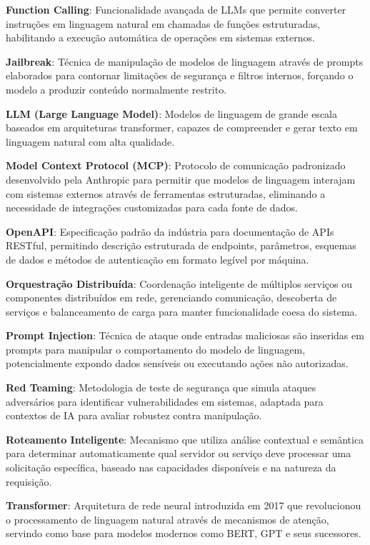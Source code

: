 \documentclass[
]{article}
\begin{document}
\textbf{Function Calling}: Funcionalidade avançada de LLMs que permite
converter instruções em linguagem natural em chamadas de funções
estruturadas, habilitando a execução automática de operações em sistemas
externos.

\textbf{Jailbreak}: Técnica de manipulação de modelos de linguagem
através de prompts elaborados para contornar limitações de segurança e
filtros internos, forçando o modelo a produzir conteúdo normalmente
restrito.

\textbf{LLM (Large Language Model)}: Modelos de linguagem de grande
escala baseados em arquiteturas transformer, capazes de compreender e
gerar texto em linguagem natural com alta qualidade.

\textbf{Model Context Protocol (MCP)}: Protocolo de comunicação
padronizado desenvolvido pela Anthropic para permitir que modelos de
linguagem interajam com sistemas externos através de ferramentas
estruturadas, eliminando a necessidade de integrações customizadas para
cada fonte de dados.

\textbf{OpenAPI}: Especificação padrão da indústria para documentação de
APIs RESTful, permitindo descrição estruturada de endpoints, parâmetros,
esquemas de dados e métodos de autenticação em formato legível por
máquina.

\textbf{Orquestração Distribuída}: Coordenação inteligente de múltiplos
serviços ou componentes distribuídos em rede, gerenciando comunicação,
descoberta de serviços e balanceamento de carga para manter
funcionalidade coesa do sistema.

\textbf{Prompt Injection}: Técnica de ataque onde entradas maliciosas
são inseridas em prompts para manipular o comportamento do modelo de
linguagem, potencialmente expondo dados sensíveis ou executando ações
não autorizadas.

\textbf{Red Teaming}: Metodologia de teste de segurança que simula
ataques adversários para identificar vulnerabilidades em sistemas,
adaptada para contextos de IA para avaliar robustez contra manipulação.

\textbf{Roteamento Inteligente}: Mecanismo que utiliza análise
contextual e semântica para determinar automaticamente qual servidor ou
serviço deve processar uma solicitação específica, baseado nas
capacidades disponíveis e na natureza da requisição.

\textbf{Transformer}: Arquitetura de rede neural introduzida em 2017 que
revolucionou o processamento de linguagem natural através de mecanismos
de atenção, servindo como base para modelos modernos como BERT, GPT e
seus sucessores.
\end{document}
